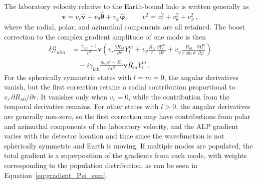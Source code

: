 The laboratory velocity relative to the Earth-bound halo is written generally as
\begin{equation}
    \boldsymbol{v}
    =
    v_r\hat{\boldsymbol{v}}
    +v_\theta\hat{\boldsymbol{\theta}}
    +v_\varphi\hat{\boldsymbol{\varphi}},
    \qquad
    v^2=v_r^2+v_\theta^2+v_\varphi^2
    \,,
\end{equation}
where the radial, polar, and azimuthal components are all retained.
The boost correction to the complex gradient amplitude of one mode is then
\begin{equation}
    \begin{aligned}
        \delta\boldsymbol{\mathcal{G}}_{nlm}
        &=
        \frac{\gamma_\mathrm{lab}-1}{v^2}\boldsymbol{v}
        \left(
        v_r\frac{\partial R_{nl}}{\partial r}Y_l^m
        +v_\theta\frac{R_{nl}}{r}\frac{\partial Y_l^m}{\partial\theta}
        +v_\varphi\frac{R_{nl}}{r\sin\theta}\frac{\partial Y_l^m}{\partial\varphi}
        \right)
        \\
        &\quad
        -i\gamma_\mathrm{lab}\frac{m_a c^2+E_n}{\hbar c^2}
        \boldsymbol{v}R_{nl}Y_l^m
        \,.
    \end{aligned}
    \label{eq:gradient_boost_mode}
\end{equation}
For the spherically symmetric states with $l=m=0$, the angular derivatives vanish, but the first correction retains a radial contribution proportional to $v_r\,\partial R_{n0}/\partial r$.
It vanishes only when $v_r=0$, while the contribution from the temporal derivative remains.
For other states with $l>0$, the angular derivatives are generally non-zero, so the first correction may have contributions from polar and azimuthal components of the laboratory velocity, and the ALP gradient varies with the detector location and time since the wavefunction is not spherically symmetric and Earth is moving.
If multiple modes are populated, the total gradient is a superposition of the gradients from each mode, with weights corresponding to the population distribution, as can be seen in Equation~\eqref{eq:gradient_Psi_sum}.
